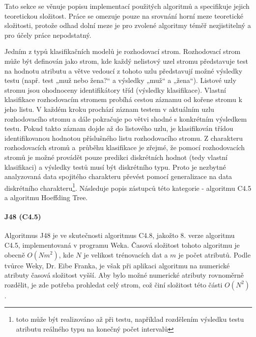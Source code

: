 \documentclass[12pt]{article}
\begin{document}
Tato sekce se věnuje popisu implementací použitých algoritmů a specifikuje jejich teoretickou složitost. Práce se omezuje pouze na srovnání horní meze teoretické složitosti, protože odhad dolní meze je pro zvolené algoritmy téměř nezjistitelný a pro účely práce nepodstatný. 

Jedním z typů klasifikačních modelů je rozhodovací strom. Rozhodovací strom může být
definován jako strom, kde každý nelistový uzel stromu představuje test na hodnotu atributu a
větve vedoucí z tohoto uzlu představují možné výsledky testu (např. test „muž nebo žena?“ a výsledky
„muž“ a „žena“). Listové uzly stromu jsou ohodnoceny identifikátory tříd (výsledky klasifikace).
\newline
\indent
Vlastní klasifikace rozhodovacím stromem probíhá cestou záznamu od kořene
stromu k jeho listu. V každém kroku prochází záznam testem v aktuálním uzlu rozhodovacího
stromu a dále pokračuje po větvi shodné s konkrétním výsledkem testu. Pokud takto
záznam dojde až do listového uzlu, je klasifikován třídou identifikovanou hodnotou příslušného
listu rozhodovacího stromu.
Z charakteru rozhodovacích stromů a~průběhu klasifikace je zřejmé, že pomocí rozhodovacích
stromů je možné provádět pouze predikci diskrétních hodnot (tedy vlastní klasifikaci) a
výsledky testů musí být diskrétního typu. Proto je nezbytné analyzovaná data spojitého charakteru
převést pomocí generalizace na data diskrétního charakteru\footnote{toto může být realizováno až při testu, například rozdělením výsledku testu atributu reálného typu na konečný počet intervalů}.\citep{rychly} 
\newline
\indent
Následuje popis zástupců této kategorie - algoritmu C4.5 a algoritmu Hoeffding Tree.
\paragraph{J48 (C4.5)}
Algoritmus J48 je ve skutečnosti algoritmus C4.8, jakožto 8. verze algoritmu C4.5, implementovaná v programu Weka. Časová složitost tohoto algoritmu je obecně $O(N m^2)$, kde $N$ je velikost trénovacích dat a $m$ je počet atributů. Podle tvůrce Weky, Dr. Eibe Franka, je však při aplikaci algoritmu na numerické atributy časová složitost vyšší. Aby bylo možné numerické atributy rovnoměrně rozdělit, je zde potřeba prohledat celý strom, což činí složitost této části $O(N^2)$. \citep{c45}
\end{document}
